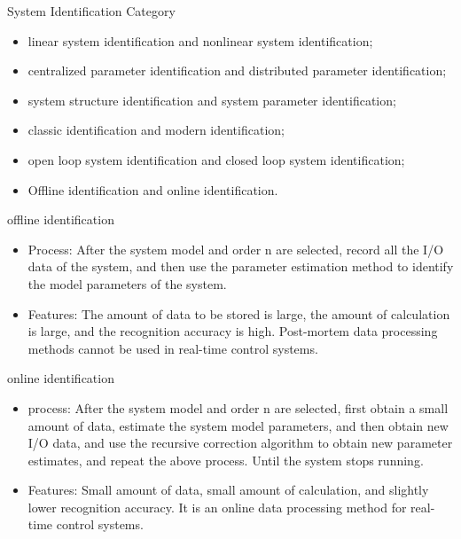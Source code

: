 \begin{frame}{System Identification Category}
\begin{itemize}
\item linear system identification and nonlinear system identification;
\item centralized parameter identification and distributed parameter identification;
\item system structure identification and system parameter identification;
\item classic identification and modern identification;
\item open loop system identification and closed loop system identification;
\item Offline identification and online identification.
\end{itemize}
\end{frame}

\begin{frame}{offline identification}
\begin{itemize}
\item Process: After the system model and order n are selected, record all the I/O data of the system, and then use the parameter estimation method to identify the model parameters of the system.
\item Features: The amount of data to be stored is large, the amount of calculation is large, and the recognition accuracy is high. Post-mortem data processing methods cannot be used in real-time control systems.
\end{itemize}
\end{frame}

\begin{frame}{online identification}
\begin{itemize}
\item process: After the system model and order n are selected, first obtain a small amount of data, estimate the system model parameters, and then obtain new I/O data, and use the recursive correction algorithm to obtain new parameter estimates, and repeat the above process. Until the system stops running.
\item Features: Small amount of data, small amount of calculation, and slightly lower recognition accuracy. It is an online data processing method for real-time control systems.
\end{itemize}
\end{frame}

